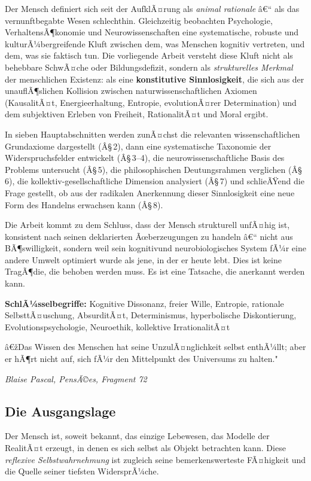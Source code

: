 ﻿\documentclass[12pt, a4paper]{article}
\begin{document}
Der Mensch definiert sich seit der AufklÃ¤rung als \textit{animal rationale} â€“
als das vernunftbegabte Wesen schlechthin. Gleichzeitig beobachten Psychologie,
VerhaltensÃ¶konomie und Neurowissenschaften eine systematische, robuste und
kulturÃ¼bergreifende Kluft zwischen dem, was Menschen kognitiv vertreten, und
dem, was sie faktisch tun. Die vorliegende Arbeit versteht diese Kluft nicht als
behebbare SchwÃ¤che oder Bildungsdefizit, sondern als \emph{strukturelles Merkmal}
der menschlichen Existenz: als eine \textbf{konstitutive Sinnlosigkeit}, die sich
aus der unauflÃ¶slichen Kollision zwischen naturwissenschaftlichen Axiomen
(KausalitÃ¤t, Energieerhaltung, Entropie, evolutionÃ¤rer Determination) und dem
subjektiven Erleben von Freiheit, RationalitÃ¤t und Moral ergibt.

In sieben Hauptabschnitten werden zunÃ¤chst die relevanten wissenschaftlichen
Grundaxiome dargestellt (Â§\,2), dann eine systematische Taxonomie der
Widerspruchsfelder entwickelt (Â§\,3--4), die neurowissenschaftliche Basis des
Problems untersucht (Â§\,5), die philosophischen Deutungsrahmen verglichen (Â§\,6),
die kollektiv-gesellschaftliche Dimension analysiert (Â§\,7) und schlieÃŸend die
Frage gestellt, ob aus der radikalen Anerkennung dieser Sinnlosigkeit eine neue
Form des Handelns erwachsen kann (Â§\,8).

Die Arbeit kommt zu dem Schluss, dass der Mensch strukturell unfÃ¤hig ist, konsistent
nach seinen deklarierten Ãœberzeugungen zu handeln â€“ nicht aus BÃ¶swilligkeit,
sondern weil sein kognitivund neurobiologisches System fÃ¼r eine andere Umwelt
optimiert wurde als jene, in der er heute lebt. Dies ist keine TragÃ¶die, die
behoben werden muss. Es ist eine Tatsache, die anerkannt werden kann.

\bigskip
\textbf{SchlÃ¼sselbegriffe:} Kognitive Dissonanz, freier Wille, Entropie, rationale
SelbsttÃ¤uschung, AbsurditÃ¤t, Determinismus, hyperbolische Diskontierung,
Evolutionspsychologie, Neuroethik, kollektive IrrationalitÃ¤t

\epigraph{â€žDas Wissen des Menschen hat seine UnzulÃ¤nglichkeit selbst enthÃ¼llt;
aber er hÃ¶rt nicht auf, sich fÃ¼r den Mittelpunkt des Universums zu halten."}%
{\textit{Blaise Pascal, PensÃ©es, Fragment 72}}

\subsection{Die Ausgangslage}

Der Mensch ist, soweit bekannt, das einzige Lebewesen, das Modelle der RealitÃ¤t
erzeugt, in denen es sich selbst als Objekt betrachten kann. Diese \emph{reflexive
Selbstwahrnehmung} ist zugleich seine bemerkenswerteste FÃ¤higkeit und die Quelle
seiner tiefsten WidersprÃ¼che.
\end{document}
